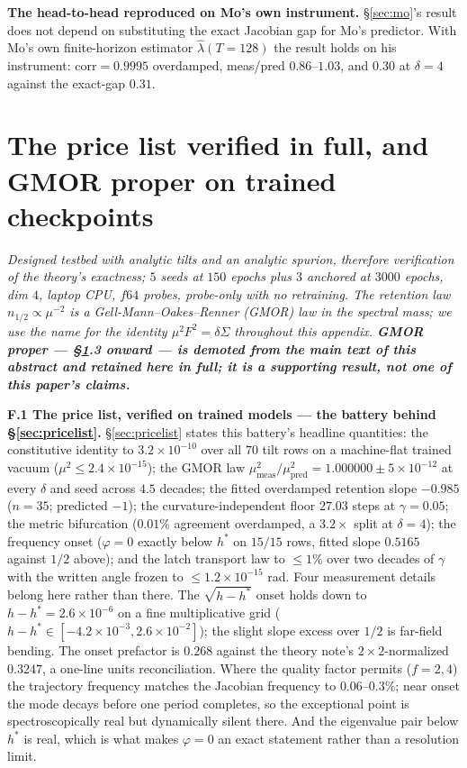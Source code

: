 \documentclass{article}
\begin{document}
\textbf{The head-to-head reproduced on Mo's own instrument.} \S\ref{sec:mo}'s result does not depend on substituting the exact Jacobian gap for Mo's predictor. With Mo's own finite-horizon estimator $\hat\lambda(T{=}128)$ the result holds on his instrument: $\mathrm{corr}=0.9995$ overdamped, meas/pred $0.86$--$1.03$, and $0.30$ at $\delta=4$ against the exact-gap $0.31$.

\section{The price list verified in full, and GMOR proper on trained checkpoints}\label{app:gmor}

\emph{Designed testbed with analytic tilts and an analytic spurion, therefore verification of the theory's exactness; $5$ seeds at $150$ epochs plus $3$ anchored at $3000$ epochs, dim $4$, laptop CPU, $f64$ probes, probe-only with no retraining. The retention law $n_{1/2}\propto\mu^{-2}$ is a Gell-Mann--Oakes--Renner (GMOR) law in the spectral mass; we use the name for the identity $\mu^2F^2=\delta\Sigma$ throughout this appendix. \textbf{GMOR proper --- \S\ref{app:gmor}.3 onward --- is demoted from the main text of this abstract and retained here in full; it is a supporting result, not one of this paper's claims.}}

\textbf{F.1 The price list, verified on trained models --- the battery behind \S\ref{sec:pricelist}.} \S\ref{sec:pricelist} states this battery's headline quantities: the constitutive identity to $3.2{\times}10^{-10}$ over all $70$ tilt rows on a machine-flat trained vacuum ($\mu^2\le2.4{\times}10^{-15}$); the GMOR law $\mu^2_{\mathrm{meas}}/\mu^2_{\mathrm{pred}}=1.000000\pm5{\times}10^{-12}$ at every $\delta$ and seed across $4.5$ decades; the fitted overdamped retention slope $-0.985$ ($n=35$; predicted $-1$); the curvature-independent floor $27.03$ steps at $\gamma=0.05$; the metric bifurcation ($0.01\%$ agreement overdamped, a $3.2\times$ split at $\delta=4$); the frequency onset ($\varphi=0$ exactly below $h^*$ on $15/15$ rows, fitted slope $0.5165$ against $1/2$ above); and the latch transport law to $\le1\%$ over two decades of $\gamma$ with the written angle frozen to $\le1.2{\times}10^{-15}$ rad. Four measurement details belong here rather than there. The $\sqrt{h-h^*}$ onset holds down to $h-h^*=2.6{\times}10^{-6}$ on a fine multiplicative grid ($h-h^*\in[-4.2{\times}10^{-3},2.6{\times}10^{-2}]$); the slight slope excess over $1/2$ is far-field bending. The onset prefactor is $0.268$ against the theory note's $2\times2$-normalized $0.3247$, a one-line units reconciliation. Where the quality factor permits ($f=2,4$) the trajectory frequency matches the Jacobian frequency to $0.06$--$0.3\%$; near onset the mode decays before one period completes, so the exceptional point is spectroscopically real but dynamically silent there. And the eigenvalue pair below $h^*$ is real, which is what makes $\varphi=0$ an exact statement rather than a resolution limit.
\end{document}
